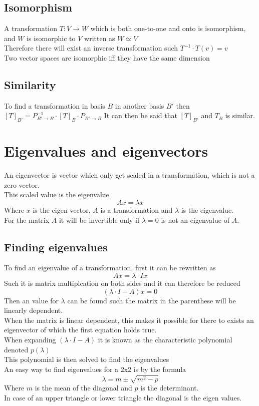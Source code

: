 \documentclass[12pt, a4paper]{article}
\begin{document}
		\subsection{Isomorphism}
			A transformation $T:V\rightarrow W$ which is both one-to-one and onto is isomorphism, and $W$ is isomorphic to $V$ written as $W\simeq V$\\
			Therefore there will exist an inverse transformation such $T^{-1}\cdot T(v)=v$\\
			Two vector spaces are isomorphic iff they have the same dimension\\
		\subsection{Similarity}
			To find a transformation in basis $B$ in another basis $B'$ then $[T]_{B'}=P^{-1}_{B'\rightarrow B}\cdot [T]_B\cdot P_{B'\rightarrow B}$
			It can then be said that $[T]_{B'}$ and $T_{B}$ is similar.
	\section{Eigenvalues and eigenvectors}
		An eigenvector is vector which only get scaled in a transformation, which is not a zero vector.\\
		This scaled value is the eigenvalue.\\
		$$Ax=\lambda x$$
		Where $x$ is the eigen vector, $A$ is a transformation and $\lambda$ is the eigenvalue.\\
		For the matrix $A$ it will be invertible only if $\lambda =0$ is not an eigenvalue of $A$.
		\subsection{Finding eigenvalues}
			To find an eigenvalue of a transformation, first it can be rewritten as
			$$Ax=\lambda\cdot I x$$
			Such it is matrix multiplcation on both sides and it can therefore be reduced
			$$(\lambda \cdot I-A)x=0$$
			Then an value for $\lambda$ can be found such the matrix in the parenthese will be linearly dependent.\\
			When the matrix is linear dependent, this makes it possible for there to exists an eigenvector of which the first equation holds true.\\
			When expanding $(\lambda\cdot I-A)$ it is known as the characteristic polynomial denoted $p(\lambda)$\\
			This polynomial is then solved to find the eigenvalues\\[4mm]
			An easy way to find eigenvalues for a 2x2 is by the formula
			$$\lambda=m\pm\sqrt{m^2-p}$$
			Where $m$ is the mean of the diagonal and $p$ is the determinant.\\[4mm]
			In case of an upper triangle or lower triangle the diagonal is the eigen values.\\
\end{document}
